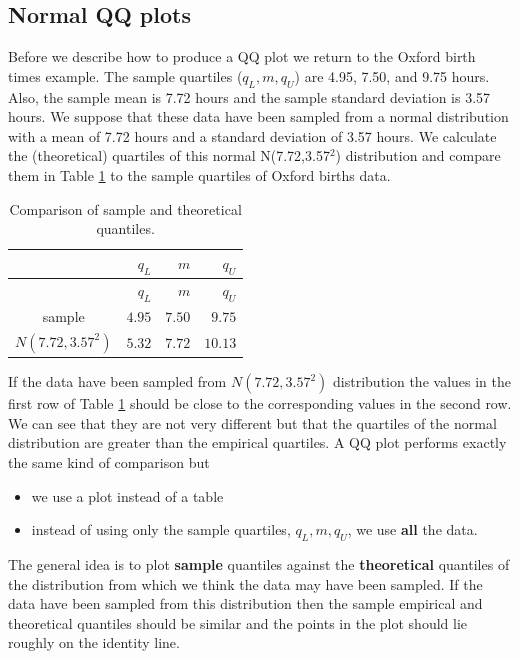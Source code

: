 \documentclass[
  british,
  11pt,
  openany, a4paper]{book}
\providecommand{\tightlist}{%
  \setlength{\itemsep}{0pt}\setlength{\parskip}{0pt}}
\begin{document}
\subsection{Normal QQ plots}\label{normal-qq-plots}

Before we describe how to produce a QQ plot we return to the Oxford birth times example. The sample quartiles (\(q_L, m, q_U\)) are 4.95, 7.50, and 9.75 hours. Also, the sample mean is 7.72 hours and the sample standard deviation is 3.57 hours. We suppose that these data have been sampled from a normal distribution with a mean of 7.72 hours and a standard deviation of 3.57 hours. We calculate the (theoretical) quartiles of this normal N(7.72,3.57\(^2\)) distribution and compare them in Table \ref{tab:compareqs} to the sample quartiles of Oxford births data.

\begin{longtable}[]{@{}crrr@{}}
\caption{\label{tab:compareqs} Comparison of sample and theoretical quantiles.}\tabularnewline
\toprule\noalign{}
& \(q_L\) & \(m\) & \(q_U\) \\
\midrule\noalign{}
\endfirsthead
\toprule\noalign{}
& \(q_L\) & \(m\) & \(q_U\) \\
\midrule\noalign{}
\endhead
\bottomrule\noalign{}
\endlastfoot
sample & \(4.95\) & \(7.50\) & \(9.75\) \\
\(N(7.72, 3.57^2)\) & \(5.32\) & \(7.72\) & \(10.13\) \\
\end{longtable}

If the data have been sampled from \(N(7.72, 3.57^2)\) distribution the values in the first row of Table \ref{tab:compareqs} should be close to the corresponding values in the second row. We can see that they are not very different but that
the quartiles of the normal distribution are greater than the empirical quartiles. A QQ plot performs exactly the same kind of comparison but

\begin{itemize}
\tightlist
\item
  we use a plot instead of a table
\item
  instead of using only the sample quartiles, \(q_L, m, q_U\), we use \textbf{all} the data.
\end{itemize}

The general idea is to plot \textbf{sample} quantiles against the \textbf{theoretical} quantiles of the distribution from which we think the data may have been sampled. If the data have been sampled from this distribution then the sample empirical and theoretical quantiles should be similar and the points in the plot should lie roughly on the identity line.
\end{document}
